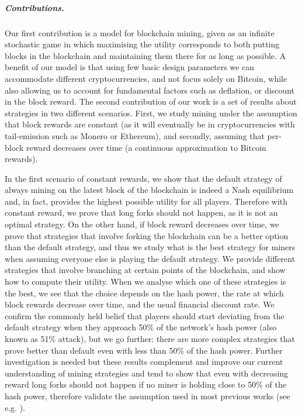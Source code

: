 \documentclass[a4paper,english,cleveref, autoref,numberwithinsect]{lipics-v2019}
\begin{document}
\subparagraph*{\bf Contributions.}  Our first contribution 
is a model for blockchain mining, given as an infinite stochastic game in which maximising the utility corresponds to both 
putting blocks in the blockchain and maintaining them there for as long as possible. A
benefit of our model is that using few basic design parameters we can 
accommodate different cryptocurrencies, and not focus solely on Bitcoin,
while also allowing us to account for fundamental factors such as deflation, or discount in the block reward. 
The second contribution of our work is a set of results about strategies in two different scenarios. First, 
we study mining under the assumption that block rewards are constant (as it will eventually be in cryptocurrencies with tail-emission such as Monero or Ethereum), and secondly, assuming that per-block reward decreases over time (a continuous approximation to Bitcoin rewards). 

In the first scenario of constant rewards, we show that the default strategy of always mining on the latest block of the blockchain is indeed a Nash equilibrium and, in fact, 
provides the highest possible utility for all players. Therefore with constant reward, we prove that long forks should not happen, as it is not an optimal strategy. 
On the other hand, if block reward decreases over time, we prove that strategies that involve forking the blockchain
can be a better option than the default strategy, and thus we study what is the best strategy for miners when assuming everyone else 
is playing the default strategy. We provide different strategies that involve branching at certain points of the blockchain, and show how to compute their 
utility. When we analyse which one of these strategies is the best, we see that the choice depends on the hash power, the rate at which 
block rewards decrease over time, and the usual financial discount rate. We confirm the commonly held belief that
players should start deviating from the default strategy 
when they approach 50\% of the network's hash power (also known as 51\% attack), but we go further: there are more complex strategies that 
prove better than default even with less than 50\% of the hash power. 
Further investigation is needed but these results complement and improve our current understanding of mining strategies and tend to show that even with decreasing reward long forks should not happen if no miner is holding close to 50\% of the hash power, therefore validate the assumption used in most previous works (see e.g. \cite{mininggames:2016,biais2018blockchain}).
\end{document}
